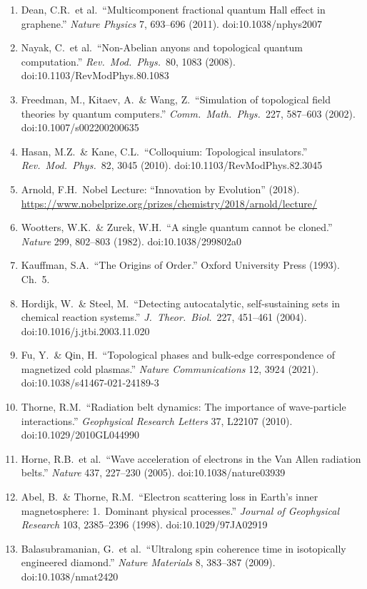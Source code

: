\begin{enumerate}
\item Dean, C.R.\ et al.\ ``Multicomponent fractional quantum Hall effect in graphene.'' \textit{Nature Physics} 7, 693--696 (2011). doi:10.1038/nphys2007
\item Nayak, C.\ et al.\ ``Non-Abelian anyons and topological quantum computation.'' \textit{Rev.\ Mod.\ Phys.}\ 80, 1083 (2008). doi:10.1103/RevModPhys.80.1083
\item Freedman, M., Kitaev, A.\ \& Wang, Z.\ ``Simulation of topological field theories by quantum computers.'' \textit{Comm.\ Math.\ Phys.}\ 227, 587--603 (2002). doi:10.1007/s002200200635
\item Hasan, M.Z.\ \& Kane, C.L.\ ``Colloquium: Topological insulators.'' \textit{Rev.\ Mod.\ Phys.}\ 82, 3045 (2010). doi:10.1103/RevModPhys.82.3045
\item Arnold, F.H.\ Nobel Lecture: ``Innovation by Evolution'' (2018). \url{https://www.nobelprize.org/prizes/chemistry/2018/arnold/lecture/}
\item Wootters, W.K.\ \& Zurek, W.H.\ ``A single quantum cannot be cloned.'' \textit{Nature} 299, 802--803 (1982). doi:10.1038/299802a0
\item Kauffman, S.A.\ ``The Origins of Order.'' Oxford University Press (1993). Ch.~5.
\item Hordijk, W.\ \& Steel, M.\ ``Detecting autocatalytic, self-sustaining sets in chemical reaction systems.'' \textit{J.\ Theor.\ Biol.}\ 227, 451--461 (2004). doi:10.1016/j.jtbi.2003.11.020
\item Fu, Y.\ \& Qin, H.\ ``Topological phases and bulk-edge correspondence of magnetized cold plasmas.'' \textit{Nature Communications} 12, 3924 (2021). doi:10.1038/s41467-021-24189-3
\item Thorne, R.M.\ ``Radiation belt dynamics: The importance of wave-particle interactions.'' \textit{Geophysical Research Letters} 37, L22107 (2010). doi:10.1029/2010GL044990
\item Horne, R.B.\ et al.\ ``Wave acceleration of electrons in the Van Allen radiation belts.'' \textit{Nature} 437, 227--230 (2005). doi:10.1038/nature03939
\item Abel, B.\ \& Thorne, R.M.\ ``Electron scattering loss in Earth's inner magnetosphere: 1.\ Dominant physical processes.'' \textit{Journal of Geophysical Research} 103, 2385--2396 (1998). doi:10.1029/97JA02919
\item Balasubramanian, G.\ et al.\ ``Ultralong spin coherence time in isotopically engineered diamond.'' \textit{Nature Materials} 8, 383--387 (2009). doi:10.1038/nmat2420

\end{enumerate}
